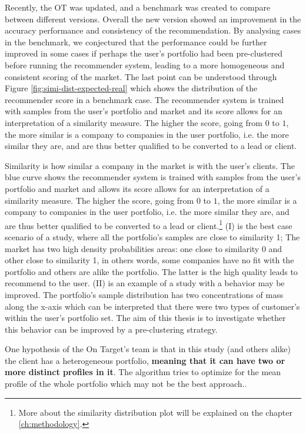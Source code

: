 Recently, the OT was updated, and a benchmark was created to compare between different versions. Overall the new version showed an improvement in the accuracy performance and consistency of the recommendation. By analysing cases in the benchmark, we conjectured that the performance could be further improved in some cases if perhaps the user's portfolio had been pre-clustered before running the recommender system, leading to a more homogeneous and consistent scoring of the market. The last point can be understood through Figure \ref{fig:simi-dist-expected-real} which shows the distribution of the recommender score in a benchmark case. The recommender system is trained with samples from the user's portfolio and market and its score allows for an interpretation of a similarity measure. The higher the score, going from $0$ to $1$, the more similar is a company to companies in the user portfolio, i.e. the more similar they are, and are thus better qualified to be converted to a lead or client.

Similarity is how similar a company in the market is with the user's clients. The blue curve shows the recommender system is trained with samples from the user's portfolio and market and allows its score allows for an interpretation of a similarity measure. The higher the score, going from $0$ to $1$, the more similar is a company to companies in the user portfolio, i.e. the more similar they are, and are thus better qualified to be converted to a lead or client.\footnote{More about the similarity distribution plot will be explained on the chapter \ref{ch:methodology}.}
(I) is the best case scenario of a study, where all the portfolio's samples are close to similarity 1; The market has two high density probabilities areas: one close to similarity 0 and other close to similarity 1, in others words, some companies have no fit with the portfolio and others are alike the portfolio. The latter is the high quality leads to recommend to the user. (II) is an example of a study with a behavior may be improved. The portfolio's sample distribution has two concentrations of mass along the x-axis which can be interpreted that there were two types of customer's within the user's portfolio set. The aim of this thesis is to investigate whether this behavior can be improved by a pre-clustering strategy.

One hypothesis of the On Target's team is that in this study (and others alike) the client has a heterogeneous portfolio, \textbf{meaning that it can have two or more distinct profiles in it}. The algorithm tries to optimize for the mean profile of the whole portfolio which may not be the best approach..

